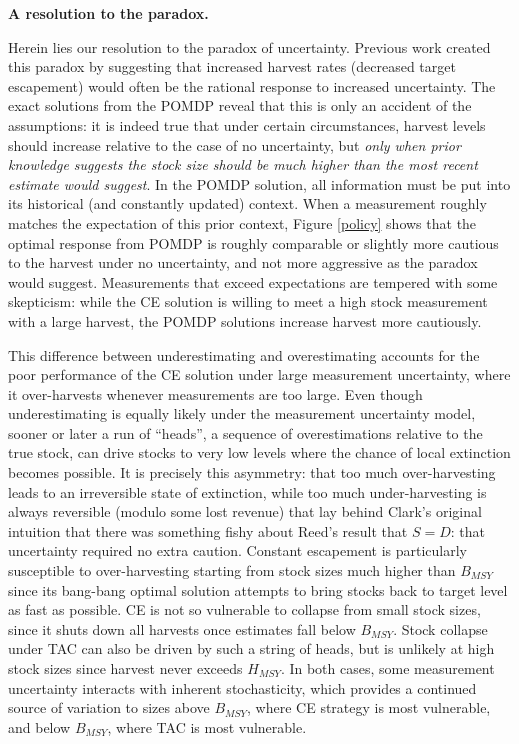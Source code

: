 \documentclass[3p]{elsarticle} %
\begin{document}
\textbf{A resolution to the paradox.}

Herein lies our resolution to the paradox of uncertainty. Previous work
created this paradox by suggesting that increased harvest rates
(decreased target escapement) would often be the rational response to
increased uncertainty. The exact solutions from the POMDP reveal that
this is only an accident of the assumptions: it is indeed true that
under certain circumstances, harvest levels should increase relative to
the case of no uncertainty, but \emph{only when prior knowledge suggests
the stock size should be much higher than the most recent estimate would
suggest}. In the POMDP solution, all information must be put into its
historical (and constantly updated) context. When a measurement roughly
matches the expectation of this prior context, Figure \ref{policy} shows
that the optimal response from POMDP is roughly comparable or slightly
more cautious to the harvest under no uncertainty, and not more
aggressive as the paradox would suggest. Measurements that exceed
expectations are tempered with some skepticism: while the CE solution is
willing to meet a high stock measurement with a large harvest, the POMDP
solutions increase harvest more cautiously.

This difference between underestimating and overestimating accounts for
the poor performance of the CE solution under large measurement
uncertainty, where it over-harvests whenever measurements are too large.
Even though underestimating is equally likely under the measurement
uncertainty model, sooner or later a run of ``heads'', a sequence of
overestimations relative to the true stock, can drive stocks to very low
levels where the chance of local extinction becomes possible. It is
precisely this asymmetry: that too much over-harvesting leads to an
irreversible state of extinction, while too much under-harvesting is
always reversible (modulo some lost revenue) that lay behind Clark's
original intuition that there was something fishy about Reed's result
that \(S = D\): that uncertainty required no extra caution. Constant
escapement is particularly susceptible to over-harvesting starting from
stock sizes much higher than \(B_{MSY}\) since its bang-bang optimal
solution attempts to bring stocks back to target level as fast as
possible. CE is not so vulnerable to collapse from small stock sizes,
since it shuts down all harvests once estimates fall below \(B_{MSY}\).
Stock collapse under TAC can also be driven by such a string of heads,
but is unlikely at high stock sizes since harvest never exceeds
\(H_{MSY}\). In both cases, some measurement uncertainty interacts with
inherent stochasticity, which provides a continued source of variation
to sizes above \(B_{MSY}\), where CE strategy is most vulnerable, and
below \(B_{MSY}\), where TAC is most vulnerable.
\end{document}
